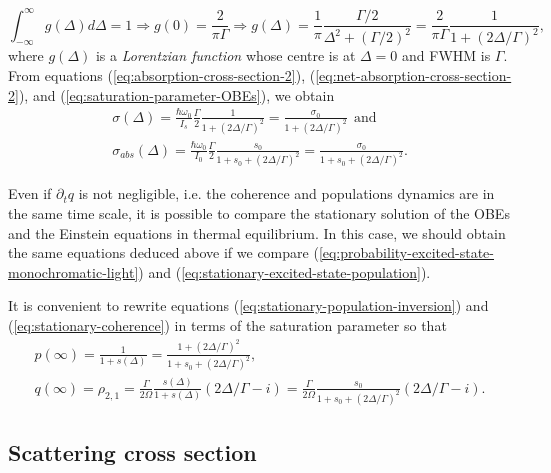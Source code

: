 {\begin{equation}
	\int_{-\infty}^{\infty} g(\Delta) d\Delta = 1 \Rightarrow g(0) = \frac{2}{\pi \Gamma} \Rightarrow g(\Delta) = \frac{1}{\pi} \frac{\Gamma/2}{\Delta^2 + (\Gamma/2)^2} = \frac{2}{\pi \Gamma} \frac{1}{1 + (2\Delta / \Gamma)^2},
	\label{eq:line-shape-function-2}
\end{equation}
where $ g(\Delta) $ is a \textit{Lorentzian function} whose centre is at $ \Delta = 0 $ and FWHM is $ \Gamma $. From equations (\ref{eq:absorption-cross-section-2}), (\ref{eq:net-absorption-cross-section-2}), and (\ref{eq:saturation-parameter-OBEs}), we obtain
\begin{gather}
	\sigma(\Delta) = \frac{\hbar \omega_0}{I_s} \frac{\Gamma}{2} \frac{1}{1 + (2\Delta/\Gamma)^2} = \frac{\sigma_0}{1 + (2\Delta / \Gamma)^2}\ \ \textrm{and}
	\label{eq:absorption-cross-section-3}
	\\
	\sigma_{abs}(\Delta) = \frac{\hbar \omega_0}{I_0} \frac{\Gamma}{2} \frac{s_0}{1 + s_0 + (2\Delta / \Gamma)^2} = \frac{\sigma_0}{1 + s_0 + (2\Delta / \Gamma)^2}.
	\label{eq:net-absorption-cross-section-3}
\end{gather}

Even if $ \partial_t q $ is not negligible, i.e. the coherence and populations dynamics are in the same time scale, it is possible to compare the stationary solution of the OBEs and the Einstein equations in thermal equilibrium. In this case, we should obtain the same equations deduced above if we compare (\ref{eq:probability-excited-state-monochromatic-light}) and (\ref{eq:stationary-excited-state-population}).

It is convenient to rewrite equations (\ref{eq:stationary-population-inversion}) and (\ref{eq:stationary-coherence}) in terms of the saturation parameter so that
\begin{gather}
	p(\infty) = \frac{1}{1 + s(\Delta)} = \frac{1 + (2\Delta / \Gamma)^2}{1 + s_0 + (2\Delta / \Gamma)^2},
	\label{eq:population-inversion-OBEs-2}
	\\
	q(\infty) = \rho_{2,1} = \frac{\Gamma}{2\Omega} \frac{s(\Delta)}{1 + s(\Delta)} (2\Delta / \Gamma - i) = \frac{\Gamma}{2\Omega} \frac{s_0}{1 + s_0 + (2\Delta/\Gamma)^2} (2\Delta / \Gamma - i).
	\label{eq:coherence-OBEs-2}
\end{gather}

\subsection{Scattering cross section}
\label{sec:scattering-cross-section}

}
